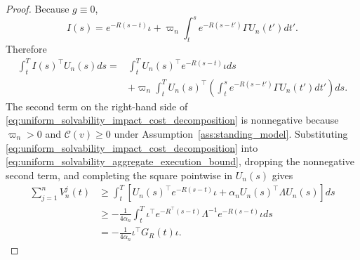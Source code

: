 \documentclass[12pt]{article}
\numberwithin{equation}{section}
\theoremstyle{definition}
\begin{document}
\begin{proof}
Because \(g\equiv0\),
\[
I(s)=e^{-R(s-t)}\iota
+\varpi_n\int_t^se^{-R(s-t')}\Gamma U_n(t')dt'.
\]
Therefore
\begin{equation}\label{eq:uniform_solvability_impact_cost_decomposition}
\begin{aligned}
\int_t^TI(s)^\top U_n(s)ds
={}&\int_t^TU_n(s)^\top e^{-R(s-t)}\iota ds
\\
&+\varpi_n\int_t^TU_n(s)^\top
\left(\int_t^se^{-R(s-t')}\Gamma U_n(t')dt'\right)ds.
\end{aligned}
\end{equation}
The second term on the right-hand side of
\eqref{eq:uniform_solvability_impact_cost_decomposition} is nonnegative because
\(\varpi_n>0\) and \(\mathcal C(v)\geq0\) under
Assumption~\ref{ass:standing_model}. Substituting
\eqref{eq:uniform_solvability_impact_cost_decomposition} into
\eqref{eq:uniform_solvability_aggregate_execution_bound}, dropping the
nonnegative second term, and completing the square pointwise in \(U_n(s)\)
gives
\begin{equation}\label{eq:uniform_solvability_aggregate_value_bound}
\begin{aligned}
\sum_{j=1}^nV_n^j(t)
&\geq
\int_t^T\left[
U_n(s)^\top e^{-R(s-t)}\iota
+\alpha_nU_n(s)^\top\Lambda U_n(s)
\right]ds
\\
&\geq
-\frac1{4\alpha_n}\int_t^T
\iota^\top e^{-R^\top(s-t)}\Lambda^{-1}e^{-R(s-t)}\iota ds
\\
&=-\frac1{4\alpha_n}\iota^\top G_R(t)\iota.
\end{aligned}
\end{equation}


\end{proof}
\end{document}
